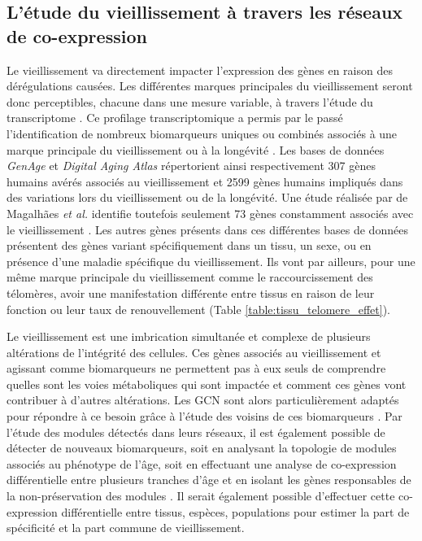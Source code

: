 \subsection{L'étude du vieillissement à travers les réseaux de co-expression}

Le vieillissement va directement impacter l'expression des gènes en raison des dérégulations causées. Les différentes marques principales du vieillissement seront donc perceptibles, chacune dans une mesure variable, à travers l'étude du transcriptome \cite{Saint2020Jun}. Ce profilage transcriptomique a permis par le passé l'identification de nombreux biomarqueurs uniques ou combinés associés à une marque principale du vieillissement ou à la longévité \cite{Melzer2020}. Les bases de données \textit{GenAge} \cite{DeMagalhaes2004} et \textit{Digital Aging Atlas} \cite{Craig2015} répertorient ainsi respectivement 307 gènes humains avérés associés au vieillissement et 2599 gènes humains impliqués dans des variations lors du vieillissement ou de la longévité. Une étude réalisée par de Magalhães \textit{et al.} identifie toutefois seulement 73 gènes constamment associés avec le vieillissement \cite{DeMagalhaes2009intro}. Les autres gènes présents dans ces différentes bases de données présentent des gènes variant spécifiquement dans un tissu, un sexe, ou en présence d'une maladie spécifique du vieillissement. Ils vont par ailleurs, pour une même marque principale du vieillissement comme le raccourcissement des télomères, avoir une manifestation différente entre tissus en raison de leur fonction ou leur taux de renouvellement (Table \ref{table:tissu_telomere_effet}).

Le vieillissement est une imbrication simultanée et complexe de plusieurs altérations de l'intégrité des cellules. Ces gènes associés au vieillissement et agissant comme biomarqueurs ne permettent pas à eux seuls de comprendre quelles sont les voies métaboliques qui sont impactée et comment ces gènes vont contribuer à d'autres altérations. 
Les \acrshort{GCN} sont alors particulièrement adaptés pour répondre à ce besoin grâce à l'étude des voisins de ces biomarqueurs \cite{delaFuente2010Jul}. Par l'étude des modules détectés dans leurs réseaux, il est également possible de détecter de nouveaux biomarqueurs, soit en analysant la topologie de modules associés au phénotype de l'âge, soit en effectuant une analyse de co-expression différentielle entre plusieurs tranches d'âge et en isolant les gènes responsables de la non-préservation des modules \cite{Zierer2015}. Il serait également possible d'effectuer cette co-expression différentielle entre tissus, espèces, populations pour estimer la part de spécificité et la part commune de vieillissement.

